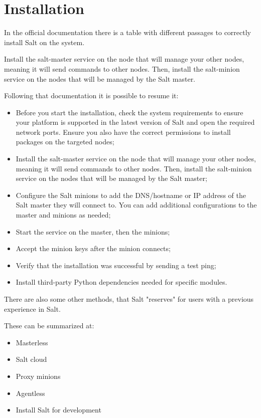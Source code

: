 \documentclass[12pt,a4paper,openright,twoside]{book}
\begin{document}
\section{Installation}

In the official documentation\cite{saltDocInstall} there is a table with different passages to correctly install Salt on the system.

Install the salt-master service on the node that will manage your other nodes, meaning it will send commands to other nodes. Then, install the salt-minion service on the nodes that will be managed by the Salt master.

Following that documentation it is possible to resume it:

\begin{itemize}
    \item Before you start the installation, check the system requirements to ensure your platform is supported in the latest version of Salt and open the required network ports. Ensure you also have the correct permissions to install packages on the targeted nodes;
    \item Install the salt-master service on the node that will manage your other nodes, meaning it will send commands to other nodes. Then, install the salt-minion service on the nodes that will be managed by the Salt master;
    \item Configure the Salt minions to add the DNS/hostname or IP address of the Salt master they will connect to. You can add additional configurations to the master and minions as needed;
    \item Start the service on the master, then the minions;
    \item Accept the minion keys after the minion connects;
    \item Verify that the installation was successful by sending a test ping;
    \item Install third-party Python dependencies needed for specific modules.
\end{itemize}

There are also some other methods, that Salt "reserves" for users with a previous experience in Salt.

These can be summarized at:
\begin{itemize}
    \item Masterless
    \item Salt cloud
    \item Proxy minions
    \item Agentless
    \item Install Salt for development
\end{itemize}
\end{document}
